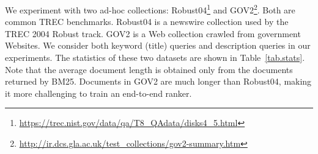 \documentclass[11pt,a4paper]{article}
\begin{document}
We experiment with two ad-hoc collections: Robust04\footnote{\url{https://trec.nist.gov/data/qa/T8_QAdata/disks4_5.html}} and GOV2\footnote{\url{http://ir.dcs.gla.ac.uk/test_collections/gov2-summary.htm}}.
Both are common TREC benchmarks.
Robust04 is a newswire collection used by the TREC 2004 Robust track.
GOV2 is a Web collection crawled from government Websites.
We consider both keyword (title) queries and description queries in our experiments.
The statistics of these two datasets are shown in Table~\ref{tab.stats}.
Note that the average document length is obtained only from the documents returned by BM25. 
Documents in GOV2 are much longer than Robust04, making it more challenging to train an end-to-end ranker.

\begin{table}[tb]
    \centering
    \caption{Collection statistics.}
    \label{tab.stats}
\end{table}
\end{document}
